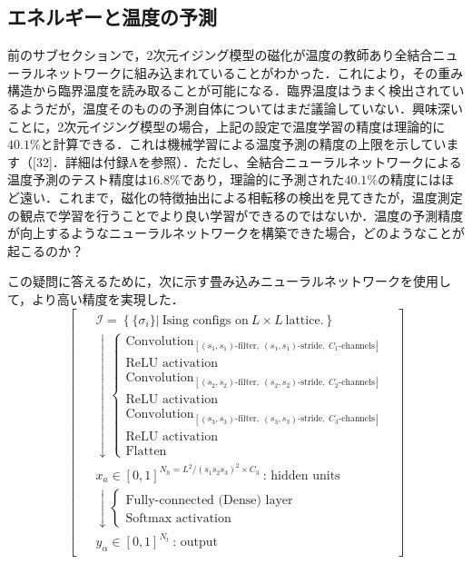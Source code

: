 \documentclass[a4paper,11pt]{jsreport}
\begin{document}
\subsection{エネルギーと温度の予測}
前のサブセクションで，2次元イジング模型の磁化が温度の教師あり全結合ニューラルネットワークに組み込まれていることがわかった．これにより，その重み構造から臨界温度を読み取ることが可能になる．臨界温度はうまく検出されているようだが，温度そのものの予測自体についてはまだ議論していない．興味深いことに，2次元イジング模型の場合，上記の設定で温度学習の精度は理論的に$40.1\%$と計算できる．これは機械学習による温度予測の精度の上限を示しています（[32]．詳細は付録Aを参照）．ただし、全結合ニューラルネットワークによる温度予測のテスト精度は$16.8\%$であり，理論的に予測された$40.1\%$の精度にはほど遠い．これまで，磁化の特徴抽出による相転移の検出を見てきたが，温度測定の観点で学習を行うことでより良い学習ができるのではないか．温度の予測精度が向上するようなニューラルネットワークを構築できた場合，どのようなことが起こるのか？\par
この疑問に答えるために，次に示す畳み込みニューラルネットワークを使用して，より高い精度を実現した．
\begin{equation}
  \begin{bmatrix}
    \begin{aligned}
       & \mathcal{I} = \left\{ \{ \sigma_i \} \Big| \ \text{Ising configs on} \ L \times L \ \text{lattice.} \right\}        \\
       & \downarrow
      \begin{cases}
        \text{Convolution}_{[(s_1,s_1)\text{-filter}, \ (s_1,s_1)\text{-stride}, \ C_1\text{-channels}]} \\
        \text{ReLU activation}                                                                           \\
        \text{Convolution}_{[(s_2,s_2)\text{-filter}, \ (s_2,s_2)\text{-stride}, \ C_2\text{-channels}]} \\
        \text{ReLU activation}                                                                           \\
        \text{Convolution}_{[(s_3,s_3)\text{-filter}, \ (s_3,s_3)\text{-stride}, \ C_3\text{-channels}]} \\
        \text{ReLU activation}                                                                           \\
        \text{Flatten}
      \end{cases} \\
       & x_a \in [0,1]^{N_h = L^2/(s_1s_2s_3)^2 \times C_3} \ \text{: hidden units}                                          \\
       & \downarrow
      \begin{cases}
        \text{Fully-connected (Dense) layer} \\
        \text{Softmax activation}
      \end{cases}                                                                                   \\
       & y_{\alpha} \in [0,1]^{N_t} \ \text{: output}
    \end{aligned}
  \end{bmatrix}
\end{equation} \label{conv model}
\end{document}
